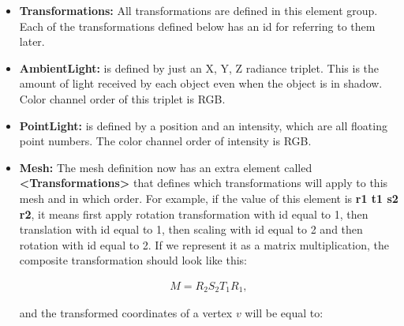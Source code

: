 \documentclass[12pt]{article}
\begin{document}
\begin{itemize}

\item \textbf{Transformations:} All transformations are defined in this
element group. Each of the transformations defined below has an id for
referring to them later.


%
\item \textbf{AmbientLight:}  is defined by just an X, Y, Z radiance
triplet. This is the amount of light received by each object even when
the object is in shadow. Color channel order of this triplet is RGB.

\item \textbf{PointLight:} is defined by a position and an intensity,
    which are all floating point numbers. The color channel order of
    intensity is RGB.

\item \textbf{Mesh:}  The mesh definition now has an extra element
called \textbf{\textless Transformations\textgreater} that defines which
transformations will apply to this mesh and in which order. For example,
if the value of this element is \textbf{r1 t1 s2 r2}, it means first
apply rotation transformation with id equal to 1, then translation with
id equal to 1, then scaling with id equal to 2 and then rotation with
id equal to 2. If we represent it as a matrix multiplication, the
composite transformation should look like this:

\begin{align}
M = R_2 S_2 T_1 R_1,
\end{align}

and the transformed coordinates of a vertex $v$ will be equal to:


\end{itemize}
\end{document}
